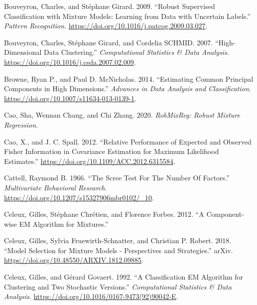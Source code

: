 \begin{CSLReferences}{1}{0}
\leavevmode{}%
Bouveyron, Charles, and Stéphane Girard. 2009. {``{Robust Supervised Classification} with {Mixture Models}: {Learning} from {Data} with {Uncertain Labels}.''} \emph{Pattern Recognition}. \url{https://doi.org/10.1016/j.patcog.2009.03.027}.

\leavevmode{}%
Bouveyron, Charles, Stéphane Girard, and Cordelia SCHMID. 2007. {``High-{Dimensional} {Data} {Clustering}.''} \emph{Computational Statistics \& Data Analysis}. \url{https://doi.org/10.1016/j.csda.2007.02.009}.

\leavevmode{}%
Browne, Ryan P., and Paul D. McNicholas. 2014. {``Estimating Common Principal Components in High Dimensions.''} \emph{Advances in Data Analysis and Classification}. \url{https://doi.org/10.1007/s11634-013-0139-1}.

\leavevmode{}%
Cao, Sha, Wennan Chang, and Chi Zhang. 2020. \emph{RobMixReg: Robust Mixture Regression}.

\leavevmode{}%
Cao, X., and J. C. Spall. 2012. {``Relative Performance of Expected and Observed Fisher Information in Covariance Estimation for Maximum Likelihood Estimates.''} \url{https://doi.org/10.1109/ACC.2012.6315584}.

\leavevmode{}%
Cattell, Raymond B. 1966. {``The {Scree} {Test} {For} {The} {Number} {Of} {Factors}.''} \emph{Multivariate Behavioral Research}. \url{https://doi.org/10.1207/s15327906mbr0102/_10}.

\leavevmode{}%
Celeux, Gilles, Stéphane Chrétien, and Florence Forbes. 2012. {``A {Component-wise EM Algorithm} for {Mixtures}.''}

\leavevmode{}%
Celeux, Gilles, Sylvia Fruewirth-Schnatter, and Christian P. Robert. 2018. {``Model Selection for Mixture Models - Perspectives and Strategies.''} arXiv. \url{https://doi.org/10.48550/ARXIV.1812.09885}.

\leavevmode{}%
Celeux, Gilles, and Gérard Govaert. 1992. {``A Classification {EM} Algorithm for Clustering and Two Stochastic Versions.''} \emph{Computational Statistics \& Data Analysis}. \url{https://doi.org/10.1016/0167-9473(92)90042-E}.


\end{CSLReferences}
